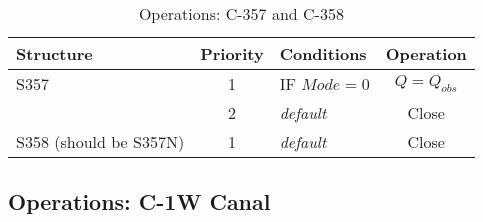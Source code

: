 \scriptsize
\begin{table}[!h]
\centering
\caption{Operations: C-357 and C-358}
\label{tab:M11ops85SMA}
\begin{tabular}{|l|c|l|c|c|}
\hline
\textbf{Structure} & \textbf{Priority}  & \textbf{Conditions} & \multicolumn{2}{|c|}{\textbf{Operation}}   \\
\hline
\hline
S357          &  1  & IF $Mode=0$                                  & \multicolumn{2}{|c|}{$Q = Q_{obs}$}   \\
\hline
              &  2  & \it{default}                                 & \multicolumn{2}{|c|}{Close}           \\
\hline
S358 \textcolor[rgb]{1.00,0.00,0.00}{(should be S357N)}          &  1  & \it{default}                                 & \multicolumn{2}{|c|}{Close}           \\
\hline
\hline
\end{tabular}
\end{table}
\normalsize


\subsection{Operations: C-1W Canal}

